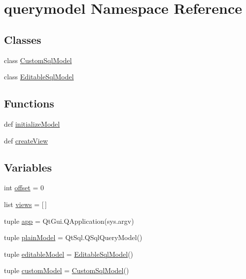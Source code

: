 \hypertarget{namespacequerymodel}{}\section{querymodel Namespace Reference}
\label{namespacequerymodel}
\subsection*{Classes}
\begin{DoxyCompactItemize}
\item 
class \hyperlink{classquerymodel_1_1CustomSqlModel}{Custom\+Sql\+Model}
\item 
class \hyperlink{classquerymodel_1_1EditableSqlModel}{Editable\+Sql\+Model}
\end{DoxyCompactItemize}
\subsection*{Functions}
\begin{DoxyCompactItemize}
\item 
def \hyperlink{namespacequerymodel_a112e93826b34cfa5d018bc43c321bf42}{initialize\+Model}
\item 
def \hyperlink{namespacequerymodel_aee15f8f6243fbab5cd47a64c6b880194}{create\+View}
\end{DoxyCompactItemize}
\subsection*{Variables}
\begin{DoxyCompactItemize}
\item 
int \hyperlink{namespacequerymodel_ac45d0851fc0f5e83a417b032bceacf19}{offset} = 0
\item 
list \hyperlink{namespacequerymodel_a245bcf56ff01541c0ed0f1004daabb2e}{views} = \mbox{[}$\,$\mbox{]}
\item 
tuple \hyperlink{namespacequerymodel_ac0449ce853620b31f000f6602dda3ef0}{app} = Qt\+Gui.\+Q\+Application(sys.\+argv)
\item 
tuple \hyperlink{namespacequerymodel_ab8b7e48d94239f4788a9a34086c56176}{plain\+Model} = Qt\+Sql.\+Q\+Sql\+Query\+Model()
\item 
tuple \hyperlink{namespacequerymodel_a0f8993806a307a2b593d08a0c1532a32}{editable\+Model} = \hyperlink{classquerymodel_1_1EditableSqlModel}{Editable\+Sql\+Model}()
\item 
tuple \hyperlink{namespacequerymodel_a89f57f5a4c16271b8761a2a145be137a}{custom\+Model} = \hyperlink{classquerymodel_1_1CustomSqlModel}{Custom\+Sql\+Model}()
\end{DoxyCompactItemize}


